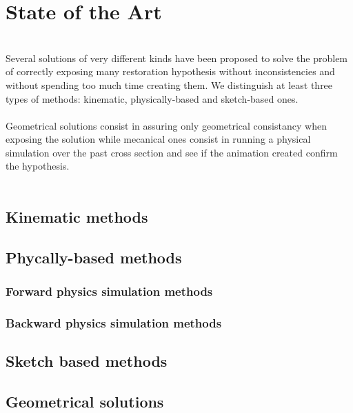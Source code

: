 \documentclass[12pt, a4paper]{memoir} %
\begin{document}
\chapter{State of the Art}\\

Several solutions of very different kinds have been proposed to solve the problem of correctly exposing many restoration hypothesis without inconsistencies and without spending too much time creating them. We distinguish at least three types of methods: kinematic, physically-based and sketch-based ones.\\\\
Geometrical solutions consist in assuring only geometrical consistancy when exposing the solution while mecanical ones consist in running a physical simulation over the past cross section and see if the animation created confirm the hypothesis.\\\\
\section{Kinematic methods}
\section{Phycally-based methods}
\subsection{Forward physics simulation methods}
\subsection{Backward physics simulation methods}
\section{Sketch based methods}

\section{Geometrical solutions}
\end{document}
